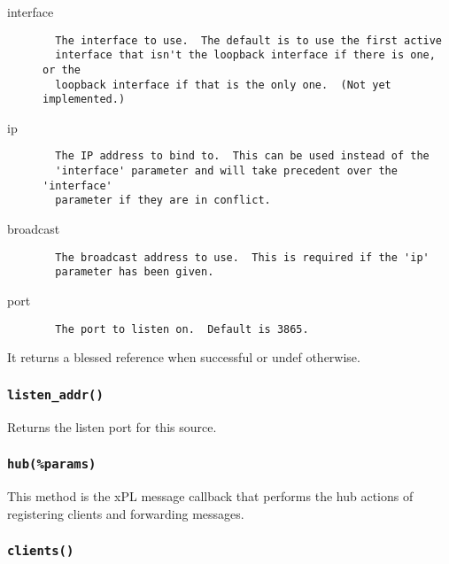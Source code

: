 \begin{description}

\item[{interface}] \mbox{}\begin{verbatim}
  The interface to use.  The default is to use the first active
  interface that isn't the loopback interface if there is one, or the
  loopback interface if that is the only one.  (Not yet implemented.)
\end{verbatim}

\item[{ip}] \mbox{}\begin{verbatim}
  The IP address to bind to.  This can be used instead of the
  'interface' parameter and will take precedent over the 'interface'
  parameter if they are in conflict.
\end{verbatim}

\item[{broadcast}] \mbox{}\begin{verbatim}
  The broadcast address to use.  This is required if the 'ip'
  parameter has been given.
\end{verbatim}

\item[{port}] \mbox{}\begin{verbatim}
  The port to listen on.  Default is 3865.
\end{verbatim}
\end{description}


It returns a blessed reference when successful or undef otherwise.

\subsubsection*{\texttt{listen\_addr()}\label{xPL::Hub_listen_addr_}}


Returns the listen port for this source.

\subsubsection*{\texttt{hub(\%params)}\label{xPL::Hub_hub_params_}}


This method is the xPL message callback that performs the hub actions
of registering clients and forwarding messages.

\subsubsection*{\texttt{clients()}\label{xPL::Hub_clients_}}


